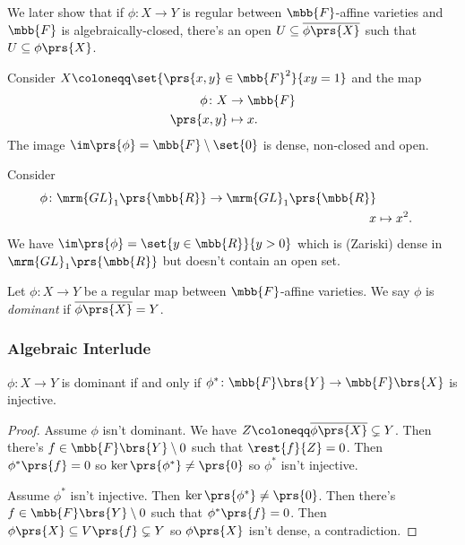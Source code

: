 \documentclass[10pt,a4paper,twoside,openany,hidelinks]{book}
\begin{document}
We later show that if $\phi \colon X \to Y$ is regular between $\mbb{F}$-affine varieties and $\mbb{F}$ is algebraically-closed, there's an open $U \subseteq \overline{\phi\prs{X}}$ such that $U \subseteq \phi\prs{X}$.

\begin{example}
Consider $X \coloneqq \set{\prs{x,y} \in \mbb{F}^2}{xy = 1}$ and the map
\begin{align*}
\phi \colon X &\to \mbb{F} \\
\prs{x,y} &\mapsto x \text{.}
\end{align*}
The image $\im\prs{\phi} = \mbb{F} \setminus \set{0}$ is dense, non-closed and open.
\end{example}

\begin{example}
Consider
\begin{align*}
\phi \colon \mrm{GL}_1\prs{\mbb{R}} \to \mrm{GL}_1\prs{\mbb{R}} \\
x &\mapsto x^2 \text{.}
\end{align*}
We have $\im\prs{\phi} = \set{y \in \mbb{R}}{y > 0}$ which is (Zariski) dense in $\mrm{GL}_1\prs{\mbb{R}}$ but doesn't contain an open set.
\end{example}

\begin{definition}
Let $\phi \colon X \to Y$ be a regular map between $\mbb{F}$-affine varieties. We say $\phi$ is \emph{dominant} if $\overline{\phi\prs{X}} = Y$.
\end{definition}

\subsubsection{Algebraic Interlude}

\begin{proposition}\label{proposition:dominant-injective}
$\phi \colon X \to Y$ is dominant if and only if $\phi^* \colon \mbb{F}\brs{Y} \to \mbb{F}\brs{X}$ is injective.
\end{proposition}

\begin{proof}
Assume $\phi$ isn't dominant. We have $Z \coloneqq \overline{\phi\prs{X}} \subsetneq Y$.
Then there's $f \in \mbb{F}\brs{Y} \setminus 0$ such that $\rest{f}{Z} = 0$. Then $\phi^*\prs{f} = 0$ so $\ker\prs{\phi^*} \neq \prs{0}$ so $\phi^*$ isn't injective.

Assume $\phi^*$ isn't injective. Then $\ker\prs{\phi^*} \neq \prs{0}$. Then there's $f \in \mbb{F}\brs{Y} \setminus 0$ such that $\phi^*\prs{f} = 0$. Then $\phi\prs{X} \subseteq V\prs{f} \subsetneq Y$ so $\phi\prs{X}$ isn't dense, a contradiction.
\end{proof}
\end{document}
